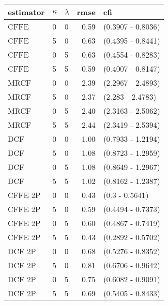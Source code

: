 \begin{tabular}{lllrl}
  \hline
estimator & $\kappa$ & $\lambda$ & rmse & cfi \\ 
  \hline
CFFE  & 0 & 0 & 0.59 & (0.3907 - 0.8036) \\ 
  CFFE  & 5 & 0 & 0.63 & (0.4395 - 0.8441) \\ 
  CFFE  & 0 & 5 & 0.63 & (0.4554 - 0.8283) \\ 
  CFFE  & 5 & 5 & 0.59 & (0.4007 - 0.8147) \\ 
  MRCF  & 0 & 0 & 2.39 & (2.2967 - 2.4893) \\ 
  MRCF  & 5 & 0 & 2.37 & (2.283 - 2.4783) \\ 
  MRCF  & 0 & 5 & 2.40 & (2.3163 - 2.5062) \\ 
  MRCF  & 5 & 5 & 2.44 & (2.3419 - 2.5394) \\ 
  DCF  & 0 & 0 & 1.00 & (0.7933 - 1.2194) \\ 
  DCF  & 5 & 0 & 1.08 & (0.8723 - 1.2959) \\ 
  DCF  & 0 & 5 & 1.08 & (0.8649 - 1.2967) \\ 
  DCF  & 5 & 5 & 1.02 & (0.8162 - 1.2387) \\ 
  CFFE 2P  & 0 & 0 & 0.43 & (0.3 - 0.5641) \\ 
  CFFE 2P  & 5 & 0 & 0.59 & (0.4494 - 0.7373) \\ 
  CFFE 2P  & 0 & 5 & 0.60 & (0.4867 - 0.7419) \\ 
  CFFE 2P  & 5 & 5 & 0.43 & (0.2892 - 0.5702) \\ 
  DCF 2P  & 0 & 0 & 0.68 & (0.5276 - 0.8352) \\ 
  DCF 2P  & 5 & 0 & 0.81 & (0.6706 - 0.9642) \\ 
  DCF 2P  & 0 & 5 & 0.75 & (0.6082 - 0.9091) \\ 
  DCF 2P  & 5 & 5 & 0.69 & (0.5405 - 0.8433) \\ 
   \hline
\end{tabular}
